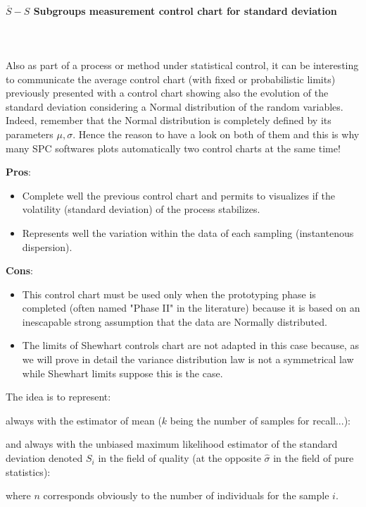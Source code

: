 	\paragraph{$\overline{S}-S$ Subgroups measurement control chart for standard deviation}\mbox{}\\\\
	Also as part of a process or method under statistical control, it can be interesting to communicate the average control chart (with fixed or probabilistic limits) previously presented with a control chart showing also the evolution of the standard deviation considering a Normal distribution of the random variables. Indeed, remember that the Normal distribution is completely defined by its parameters $\mu,\sigma$. Hence the reason to have a look on both of them and this is why many SPC softwares plots automatically two control charts at the same time!
	
	\textbf{Pros}:
	\begin{itemize}
		\item Complete well the previous control chart and permits to visualizes if the volatility (standard deviation) of the process stabilizes. 

		\item Represents well the variation within the data of each sampling (instantenous dispersion).
	\end{itemize}

	\textbf{Cons}:
	\begin{itemize}
		\item This control chart must be used only when the prototyping phase is completed (often named "Phase II" in the literature) because it is based on an inescapable strong assumption that the data are Normally distributed. 

		\item The limits of Shewhart controls chart are not adapted in this case because, as we will prove in detail the variance distribution law is not a symmetrical law while Shewhart limits suppose this is the case.
 	\end{itemize}
 	The idea is to represent:
	
	always with the estimator of mean ($k$ being the number of samples for recall...):
	
	and always with the unbiased maximum likelihood estimator of the standard deviation denoted $S_i$ in the field of quality (at the opposite $\hat{\sigma}$ in the field of pure statistics):
	
	where $n$ corresponds obviously to the number of individuals for the sample $i$.

